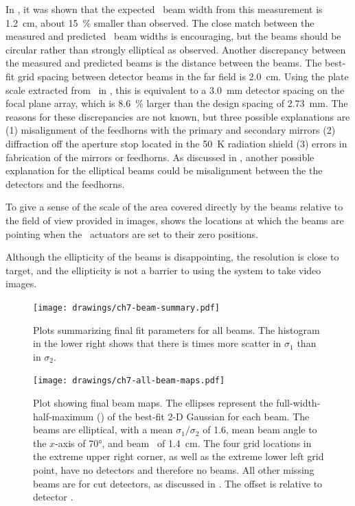 In , it was shown that the expected \FWHM\ beam width from this measurement is \SI{1.2}{\cm}, about \SI{15}{\percent} smaller than observed.
The close match between the measured and predicted \FWHM\ beam widths is encouraging, but the beams should be circular rather than strongly elliptical as observed.
Another discrepancy between the measured and predicted beams is the distance between the beams.
The best-fit grid spacing between detector beams in the far field is \SI{2.0}{\cm}.
Using the plate scale extracted from \ZEMAX\ in , this is equivalent to a \SI{3.0}{\mm} detector spacing on the focal plane array, which is \SI{8.6}{\percent} larger than the design spacing of \SI{2.73}{\mm}.
The reasons for these discrepancies are not known, but three possible explanations are (1) misalignment of the feedhorns with the primary and secondary mirrors (2) diffraction off the aperture stop located in the \SI{50}{\kelvin} radiation shield (3) errors in fabrication of the mirrors or feedhorns.
As discussed in , another possible explanation for the elliptical beams could be misalignment between the the detectors and the feedhorns.

To give a sense of the scale of the area covered directly by the beams relative to the field of view provided in images,  shows the locations at which the beams are pointing when the \BOSE\ actuators are set to their zero positions.

Although the ellipticity of the beams is disappointing, the resolution is close to target, and the ellipticity is not a barrier to using the system to take video images.

\begin{figure}
\centering
\texttt{[image: drawings/ch7-beam-summary.pdf]}
\caption[Beam fit parameters]{
  Plots summarizing final fit parameters for all beams.
  The histogram in the lower right shows that there is  times more scatter in $\sigma_1$ than in $\sigma_2$. 
}
\label{fig:ch7-beam-summary}
\end{figure}

\begin{figure}
\centering
\texttt{[image: drawings/ch7-all-beam-maps.pdf]}
\caption[Beam maps]{
Plot showing final beam maps.
The ellipses represent the full-width-half-maximum (\FWHM) of the best-fit 2-D Gaussian for each beam. The beams are elliptical, with a mean $\sigma_1/\sigma_2$ of 1.6, mean beam angle to the $x$-axis of \ang{70}, and beam \FWHM\ of \SI{1.4}{\cm}.
The four grid locations in the extreme upper right corner, as well as the extreme lower left grid point, have no detectors and therefore no beams. All other missing beams are for cut detectors, as discussed in .
The offset is relative to detector .
}
\label{fig:ch7-all-beam-maps}
\end{figure}

